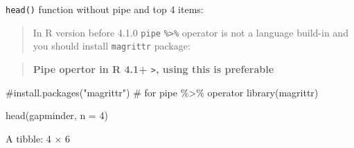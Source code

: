 \documentclass[
  letterpaper,
  DIV=11,
  numbers=noendperiod]{scrreprt}
\newenvironment{Shaded}{\begin{snugshade}}{\end{snugshade}}
\newcommand{\AttributeTok}[1]{\textcolor[rgb]{0.40,0.45,0.13}{#1}}
\newcommand{\CommentTok}[1]{\textcolor[rgb]{0.37,0.37,0.37}{#1}}
\newcommand{\DecValTok}[1]{\textcolor[rgb]{0.68,0.00,0.00}{#1}}
\newcommand{\FunctionTok}[1]{\textcolor[rgb]{0.28,0.35,0.67}{#1}}
\newcommand{\NormalTok}[1]{\textcolor[rgb]{0.00,0.23,0.31}{#1}}
\begin{document}
\texttt{head()} function without pipe and top 4 items:

\begin{quote}
In R version before 4.1.0 \texttt{pipe} \texttt{\%\textgreater{}\%}
operator is not a language build-in and you should install
\texttt{magrittr} package:
\end{quote}

\begin{quote}
\textbf{Pipe opertor in R 4.1+ \texttt{\textbar{}\textgreater{}}, using
this is preferable}
\end{quote}

\begin{Shaded}
\begin{Highlighting}[]
\CommentTok{\#install.packages("magrittr") \# for pipe \%\textgreater{}\% operator}
\FunctionTok{library}\NormalTok{(magrittr)}
\end{Highlighting}
\end{Shaded}

\begin{Shaded}
\begin{Highlighting}[]
\FunctionTok{head}\NormalTok{(gapminder, }\AttributeTok{n =} \DecValTok{4}\NormalTok{)}
\end{Highlighting}
\end{Shaded}

A tibble: 4 × 6
\end{document}
